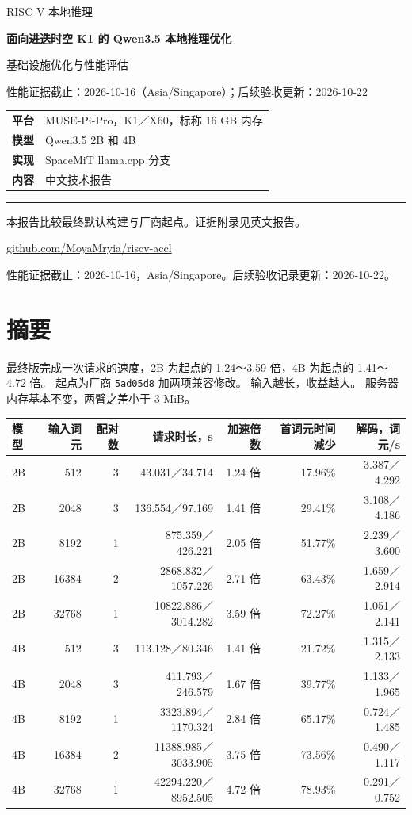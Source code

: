 \documentclass[10pt,a4paper,fontset=none]{ctexart}
\begin{document}
\begin{titlepage}
\vspace*{15mm}
{\large\textcolor{reportblue}{RISC-V 本地推理}}\par
\vspace{12mm}
{\Huge\bfseries 面向进迭时空 K1 的 Qwen3.5 本地推理优化\par}
\vspace{8mm}
{\Large 基础设施优化与性能评估\par}
\vspace{12mm}
{\large 性能证据截止：2026-10-16（Asia/Singapore）；后续验收更新：2026-10-22\par}
\vspace{14mm}
\begin{tabular}{@{}ll@{}}
\textbf{平台} & MUSE-Pi-Pro，K1／X60，标称 16 GB 内存 \\
\textbf{模型} & Qwen3.5 2B 和 4B \\
\textbf{实现} & SpaceMiT llama.cpp 分支 \\
\textbf{内容} & 中文技术报告 \\
\end{tabular}
\vfill
\textcolor{reportblue}{\rule{\textwidth}{1pt}}\par
本报告比较最终默认构建与厂商起点。证据附录见英文报告。\par
\vspace{6mm}
\href{https://github.com/MoyaMryia/riscv-accl}{github.com/MoyaMryia/riscv-accl}
\end{titlepage}
{\small\tableofcontents}
\clearpage
性能证据截止：2026-10-16，Asia/Singapore。后续验收记录更新：2026-10-22。

\hypertarget{ux6458ux8981}{%
\section{摘要}\label{ux6458ux8981}}

最终版完成一次请求的速度，2B 为起点的 1.24～3.59 倍，4B 为起点的
1.41～4.72 倍。 起点为厂商 \nolinkurl{5ad05d8} 加两项兼容修改。
输入越长，收益越大。 服务器内存基本不变，两臂之差小于 3 MiB。

\begin{longtable}[]{@{}lrrrrrr@{}}
\toprule
模型 & 输入词元 & 配对数 & 请求时长，s & 加速倍数 & 首词元时间减少 &
解码，词元/s\tabularnewline
\midrule
\endhead
2B & 512 & 3 & 43.031／34.714 & 1.24 倍 & 17.96\% &
3.387／4.292\tabularnewline
2B & 2048 & 3 & 136.554／97.169 & 1.41 倍 & 29.41\% &
3.108／4.186\tabularnewline
2B & 8192 & 1 & 875.359／426.221 & 2.05 倍 & 51.77\% &
2.239／3.600\tabularnewline
2B & 16384 & 2 & 2868.832／1057.226 & 2.71 倍 & 63.43\% &
1.659／2.914\tabularnewline
2B & 32768 & 1 & 10822.886／3014.282 & 3.59 倍 & 72.27\% &
1.051／2.141\tabularnewline
4B & 512 & 3 & 113.128／80.346 & 1.41 倍 & 21.72\% &
1.315／2.133\tabularnewline
4B & 2048 & 3 & 411.793／246.579 & 1.67 倍 & 39.77\% &
1.133／1.965\tabularnewline
4B & 8192 & 1 & 3323.894／1170.324 & 2.84 倍 & 65.17\% &
0.724／1.485\tabularnewline
4B & 16384 & 2 & 11388.985／3033.905 & 3.75 倍 & 73.56\% &
0.490／1.117\tabularnewline
4B & 32768 & 1 & 42294.220／8952.505 & 4.72 倍 & 78.93\% &
0.291／0.752\tabularnewline
\bottomrule
\end{longtable}
\end{document}
